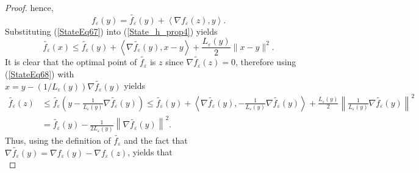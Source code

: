 \documentclass[12pt]{article}
\numberwithin{equation}{section}
\begin{document}
\begin{proof}
hence,
\begin{equation}
	 f_{\varepsilon}(y) = \widetilde{f_{\varepsilon}}(y) + \left\langle \nabla f_{\varepsilon}(z), y \right\rangle . \label{StateEq67}
\end{equation}
Substituting (\ref{StateEq67}) into (\ref{State_h_prop4}) yields
\begin{equation}
	\widetilde{f_{\varepsilon}}(x) \leq \widetilde{f_{\varepsilon}}(y) + \left\langle \nabla \widetilde{f_{\varepsilon}}(y), x-y \right\rangle + \frac{L_{\varepsilon}(y)}{2} \|x-y\|^2. \label{StateEq68}
\end{equation}
It is clear that the optimal point of $\widetilde{f_{\varepsilon}}$ is $z$ since $\nabla \widetilde{f_{\varepsilon}}(z) = 0$, therefore using (\ref{StateEq68}) with \\$x = y - \left( 1/L_{\varepsilon}(y) \right) \nabla \widetilde{f_{\varepsilon}}(y)$ yields
\begin{align*}
	\widetilde{f_{\varepsilon}}(z) &\leq \widetilde{f_{\varepsilon}}\left( y - \frac{1}{L_{\varepsilon}(y)} \nabla \widetilde{f_{\varepsilon}}(y) \right) \leq \widetilde{f_{\varepsilon}}(y) + \left\langle \nabla \widetilde{f_{\varepsilon}}(y), - \frac{1}{L_{\varepsilon}(y)} \nabla \widetilde{f_{\varepsilon}}(y) \right\rangle + \frac{L_{\varepsilon}(y)}{2} \left\lVert \frac{1}{L_{\varepsilon}(y)} \nabla \widetilde{f_{\varepsilon}}(y) \right\rVert ^2 \\
	&= \widetilde{f_{\varepsilon}}(y) - \frac{1}{2 L_{\varepsilon}(y)} \left\lVert \nabla \widetilde{f_{\varepsilon}}(y) \right\rVert ^2.
\end{align*}
Thus, using the definition of $\widetilde{f_{\varepsilon}}$ and the fact that $\nabla \widetilde{f_{\varepsilon}}(y) = \nabla f_{\varepsilon}(y) - \nabla f_{\varepsilon}(z)$, yields that
\begin{equation*}

\end{equation*}
\end{proof}
\end{document}
